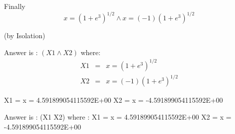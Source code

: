 Finally
\[x = (1 + e^3)^{1/2} \wedge x = (-1)(1 + e^3)^{1/2}\]

(by Isolation)

Answer is : $(X1 \wedge X2)$ where:
\begin{eqnarray*}
X1 & = & x = (1 + e^3)^{1/2}\\
X2 & = & x = (-1)(1 + e^3)^{1/2}
\end{eqnarray*}


    X1 =  x = 4.591899054115592E+00
    X2 =  x = -4.591899054115592E+00


Answer is : 
(X1 \wedge X2)
  where :
    X1 =  x = 4.591899054115592E+00
    X2 =  x = -4.591899054115592E+00


